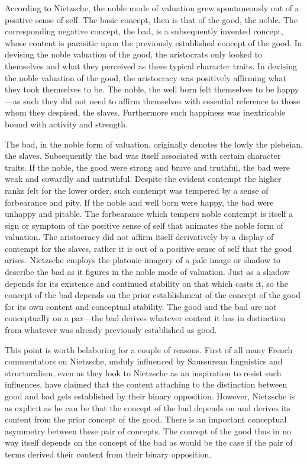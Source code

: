 According to Nietzsche, the noble mode of valuation grew spontaneously out of a positive sense of self. The basic concept, then is that of the good, the noble. The corresponding negative concept, the bad, is a subsequently invented concept, whose content is parasitic upon the previously established concept of the good. In devising the noble valuation of the good, the aristocrats only looked to themselves and what they perceived as there typical character traits. In devising the noble valuation of the good, the aristocracy was positively affirming what they took themselves to be. The noble, the well born felt themselves to be happy---as such they did not need to affirm themselves with essential reference to those whom they despised, the slaves. Furthermore such happiness was inextricable bound with activity and strength.

The bad, in the noble form of valuation, originally denotes the lowly the plebeian, the slaves. Subsequently the bad was itself associated with certain character traits. If the noble, the good were strong and brave and truthful, the bad were weak and cowardly and untruthful. Despite the evident contempt the higher ranks felt for the lower order, such contempt was tempered by a sense of forbearance and pity. If the noble and well born were happy, the bad were unhappy and pitable. The forbearance which tempers noble contempt is itself a sign or symptom of the positive sense of self that animates the noble form of valuation. The aristocracy did not affirm itself derivatively by a display of contempt for the slaves, rather it is out of a positive sense of self that the good arises. Nietzsche employs the platonic imagery of a pale image or shadow to describe the bad as it figures in the noble mode of valuation. Just as a shadow depends for its existence and continued stability on that which casts it, so the concept of the bad depends on the prior establishment of the concept of the good for its own content and conceptual stability. The good and the bad are not conceptually on a par---the bad derives whatever content it has in distinction from whatever was already previously established as good.

This point is worth belaboring for a couple of reasons. First of all many French commentators on Nietzsche, unduly influenced by Saussurean linguistics and structuralism, even as they look to Nietzsche as an inspiration to resist such influences, have claimed that the content attaching to the distinction between good and bad gets established by their binary opposition. However, Nietzsche is as explicit as he can be that the concept of the bad depends on and derives its content from the prior concept of the good. There is an important conceptual asymmetry between these pair of concepts. The concept of the good thus in no way itself depends on the concept of the bad as would be the case if the pair of terms derived their content from their binary opposition. 


